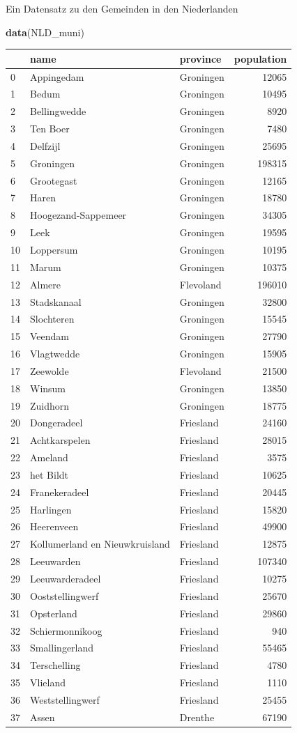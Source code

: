 \documentclass[ignorenonframetext,]{beamer}
\newenvironment{Shaded}{\begin{snugshade}}{\end{snugshade}}
\newcommand{\KeywordTok}[1]{\textcolor[rgb]{0.13,0.29,0.53}{\textbf{#1}}}
\newcommand{\NormalTok}[1]{#1}
\begin{document}
\begin{frame}[fragile]{Ein Datensatz zu den Gemeinden in den
Niederlanden}
\protect\hypertarget{ein-datensatz-zu-den-gemeinden-in-den-niederlanden}{}

\begin{Shaded}
\begin{Highlighting}[]
\KeywordTok{data}\NormalTok{(NLD_muni)}
\end{Highlighting}
\end{Shaded}

\begin{longtable}[]{@{}lllr@{}}
\toprule
& name & province & population\tabularnewline
\midrule
\endhead
0 & Appingedam & Groningen & 12065\tabularnewline
1 & Bedum & Groningen & 10495\tabularnewline
2 & Bellingwedde & Groningen & 8920\tabularnewline
3 & Ten Boer & Groningen & 7480\tabularnewline
4 & Delfzijl & Groningen & 25695\tabularnewline
5 & Groningen & Groningen & 198315\tabularnewline
6 & Grootegast & Groningen & 12165\tabularnewline
7 & Haren & Groningen & 18780\tabularnewline
8 & Hoogezand-Sappemeer & Groningen & 34305\tabularnewline
9 & Leek & Groningen & 19595\tabularnewline
10 & Loppersum & Groningen & 10195\tabularnewline
11 & Marum & Groningen & 10375\tabularnewline
12 & Almere & Flevoland & 196010\tabularnewline
13 & Stadskanaal & Groningen & 32800\tabularnewline
14 & Slochteren & Groningen & 15545\tabularnewline
15 & Veendam & Groningen & 27790\tabularnewline
16 & Vlagtwedde & Groningen & 15905\tabularnewline
17 & Zeewolde & Flevoland & 21500\tabularnewline
18 & Winsum & Groningen & 13850\tabularnewline
19 & Zuidhorn & Groningen & 18775\tabularnewline
20 & Dongeradeel & Friesland & 24160\tabularnewline
21 & Achtkarspelen & Friesland & 28015\tabularnewline
22 & Ameland & Friesland & 3575\tabularnewline
23 & het Bildt & Friesland & 10625\tabularnewline
24 & Franekeradeel & Friesland & 20445\tabularnewline
25 & Harlingen & Friesland & 15820\tabularnewline
26 & Heerenveen & Friesland & 49900\tabularnewline
27 & Kollumerland en Nieuwkruisland & Friesland & 12875\tabularnewline
28 & Leeuwarden & Friesland & 107340\tabularnewline
29 & Leeuwarderadeel & Friesland & 10275\tabularnewline
30 & Ooststellingwerf & Friesland & 25670\tabularnewline
31 & Opsterland & Friesland & 29860\tabularnewline
32 & Schiermonnikoog & Friesland & 940\tabularnewline
33 & Smallingerland & Friesland & 55465\tabularnewline
34 & Terschelling & Friesland & 4780\tabularnewline
35 & Vlieland & Friesland & 1110\tabularnewline
36 & Weststellingwerf & Friesland & 25455\tabularnewline
37 & Assen & Drenthe & 67190\tabularnewline

\end{longtable}
\end{frame}
\end{document}
